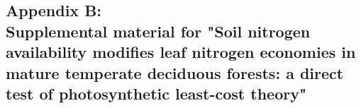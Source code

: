 \begin{singlespace}
    \chapter{\textbf{Appendix B: \\ Supplemental material for "Soil nitrogen availability modifies leaf nitrogen economies in mature temperate deciduous forests: a direct test of photosynthetic least-cost theory"}}
\end{singlespace}

\setcounter{table}{0}
\renewcommand{\thetable}{B\arabic{table}}

\setcounter{figure}{0}
\renewcommand{\thefigure}{B\arabic{figure}}

\begin{table}[h!]
    \caption{Sample sizes of each species, abbreviated by their USDA NRCS PLANTS database code, within each plot at each site}
    \label{table:tab.b1}
\end{table}
